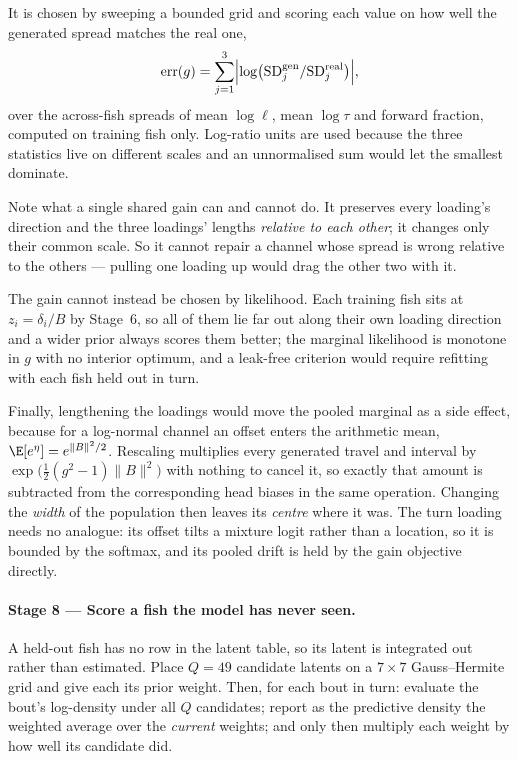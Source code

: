 It is chosen by sweeping a bounded grid and scoring each value on how well the
generated spread matches the real one,
\[
\mathrm{err}(g)=\sum_{j=1}^{3}
\Bigl|\log\bigl(\mathrm{SD}^{\text{gen}}_j / \mathrm{SD}^{\text{real}}_j\bigr)\Bigr| ,
\]
over the across-fish spreads of mean $\log\ell$, mean $\log\tau$ and forward
fraction, computed on training fish only. Log-ratio units are used because the
three statistics live on different scales and an unnormalised sum would let the
smallest dominate.

Note what a single shared gain can and cannot do. It preserves every loading's
direction and the three loadings' lengths \emph{relative to each other};
it changes only their common scale. So it cannot repair a channel whose spread
is wrong relative to the others --- pulling one loading up would drag the other
two with it.

The gain cannot instead be chosen by likelihood. Each training fish sits at
$z_i=\delta_i/B$ by Stage~6, so all of them lie far out along their own loading
direction and a wider prior always scores them better; the marginal likelihood
is monotone in $g$ with no interior optimum, and a leak-free criterion would
require refitting with each fish held out in turn.

Finally, lengthening the loadings would move the pooled marginal as a side
effect, because for a log-normal channel an offset enters the arithmetic mean,
$\E[e^{\eta}]=e^{\lVert B\rVert^2/2}$. Rescaling multiplies every generated
travel and interval by $\exp\bigl(\tfrac12(g^2-1)\lVert B\rVert^2\bigr)$ with
nothing to cancel it, so exactly that amount is subtracted from the
corresponding head biases in the same operation. Changing the \emph{width} of
the population then leaves its \emph{centre} where it was. The turn loading
needs no analogue: its offset tilts a mixture logit rather than a location, so
it is bounded by the softmax, and its pooled drift is held by the gain objective
directly.

\paragraph{Stage 8 --- Score a fish the model has never seen.}
A held-out fish has no row in the latent table, so its latent is integrated out
rather than estimated. Place $Q=49$ candidate latents on a $7\times7$
Gauss--Hermite grid and give each its prior weight. Then, for each bout in turn:
evaluate the bout's log-density under all $Q$ candidates; report as the
predictive density the weighted average over the \emph{current} weights; and only
then multiply each weight by how well its candidate did.

